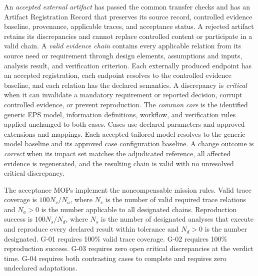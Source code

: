 \documentclass[11pt,a4paper]{article}
\begin{document}
An \emph{accepted external artifact} has passed the common transfer checks and has an Artifact Registration Record that preserves its source record, controlled evidence baseline, provenance, applicable traces, and acceptance status. A rejected artifact retains its discrepancies and cannot replace controlled content or participate in a valid chain. A \emph{valid evidence chain} contains every applicable relation from its source need or requirement through design elements, assumptions and inputs, analysis result, and verification criterion. Each externally produced endpoint has an accepted registration, each endpoint resolves to the controlled evidence baseline, and each relation has the declared semantics. A discrepancy is \emph{critical} when it can invalidate a mandatory requirement or reported decision, corrupt controlled evidence, or prevent reproduction. The \emph{common core} is the identified generic EPS model, information definitions, workflow, and verification rules applied unchanged to both cases. Cases use declared parameters and approved extensions and mappings. Each accepted tailored model resolves to the generic model baseline and its approved case configuration baseline. A change outcome is \emph{correct} when its impact set matches the adjudicated reference, all affected evidence is regenerated, and the resulting chain is valid with no unresolved critical discrepancy.

The acceptance MOPs implement the noncompensable mission rules. Valid trace coverage is $100N_v/N_a$, where $N_v$ is the number of valid required trace relations and $N_a>0$ is the number applicable to all designated chains. Reproduction success is $100N_s/N_d$, where $N_s$ is the number of designated analyses that execute and reproduce every declared result within tolerance and $N_d>0$ is the number designated. G-01 requires 100\% valid trace coverage. G-02 requires 100\% reproduction success. G-03 requires zero open critical discrepancies at the verdict time. G-04 requires both contrasting cases to complete and requires zero undeclared adaptations.
\end{document}
